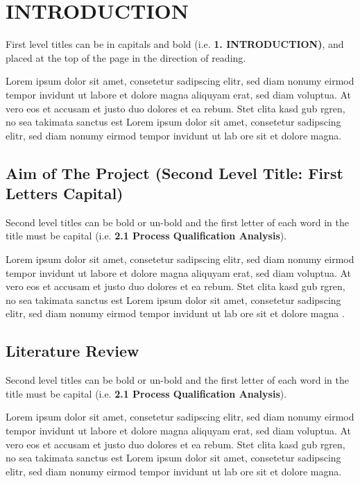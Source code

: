\chapter{INTRODUCTION}\label{Ch1}
First level titles can be in capitals and bold (i.e. \textbf{1. INTRODUCTION)}, and placed at the top of the page in the direction of reading.

Lorem ipsum dolor sit amet, consetetur sadipscing elitr, sed diam nonumy eirmod tempor invidunt ut labore et dolore magna aliquyam erat, sed diam voluptua. At vero eos et accusam et justo duo dolores et ea rebum. Stet clita kasd gub rgren, no sea takimata sanctus est  Lorem ipsum dolor sit amet, consetetur sadipscing elitr,  sed diam nonumy eirmod tempor invidunt ut lab  ore sit et dolore magna.

\section{Aim of The Project (Second Level Title: First Letters Capital)}\label{significanceofthesis}

Second level titles can be bold or un-bold and the first letter of each word in the title must be capital (i.e. \textbf{2.1 Process Qualification Analysis}).

Lorem ipsum dolor sit amet, consetetur sadipscing elitr, sed diam nonumy eirmod tempor invidunt ut labore et dolore magna aliquyam erat, sed diam voluptua. At vero eos et accusam et justo duo dolores et ea rebum. Stet clita kasd gub rgren, no sea takimata sanctus est Lorem ipsum dolor sit amet, consetetur sadipscing elitr, sed diam nonumy eirmod tempor invidunt ut lab ore sit et dolore magna \cite{Cutler2015, acar97, HYP:HYP57}.

\section{Literature Review}\label{purposeofthesis}

Second level titles can be bold or un-bold and the first letter of each word in the title must be capital (i.e. \textbf{2.1 Process Qualification Analysis}).

Lorem ipsum dolor sit amet, consetetur sadipscing elitr, sed diam nonumy eirmod tempor invidunt ut labore et dolore magna aliquyam erat, sed diam voluptua. At vero eos et accusam et justo duo dolores et ea rebum. Stet clita kasd gub rgren, no sea takimata sanctus est Lorem ipsum dolor sit amet, consetetur sadipscing elitr, sed diam nonumy eirmod tempor invidunt ut lab ore sit et dolore magna.

